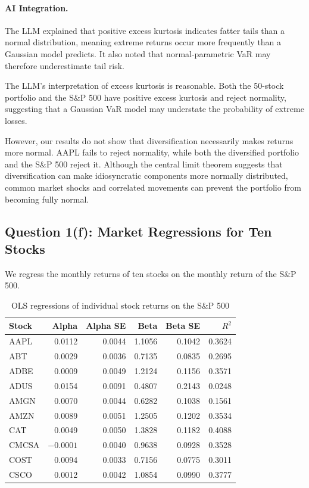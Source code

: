 \documentclass[11pt]{article}
\begin{document}
\paragraph{AI Integration.} The LLM explained that positive excess kurtosis indicates fatter tails than a normal distribution, meaning extreme returns occur more frequently than a Gaussian model predicts. It also noted that normal-parametric VaR may therefore underestimate tail risk.

The LLM's interpretation of excess kurtosis is reasonable. Both the 50-stock portfolio and the S\&P 500 have positive excess kurtosis and reject normality, suggesting that a Gaussian VaR model may understate the probability of extreme losses.

However, our results do not show that diversification necessarily makes returns more normal. AAPL fails to reject normality, while both the diversified portfolio and the S\&P 500 reject it. Although the central limit theorem suggests that diversification can make idiosyncratic components more normally distributed, common market shocks and correlated movements can prevent the portfolio from becoming fully normal.

\subsection{Question 1(f): Market Regressions for Ten Stocks}

We regress the monthly returns of ten stocks on the monthly return of the S\&P 500.

\begin{table}[H]
\centering
\caption{OLS regressions of individual stock returns on the S\&P 500}
\begin{tabular}{lrrrrr}
\toprule
Stock & Alpha & Alpha SE & Beta & Beta SE & $R^2$ \\
\midrule
AAPL  & 0.0112 & 0.0044 & 1.1056 & 0.1042 & 0.3624 \\
ABT   & 0.0029 & 0.0036 & 0.7135 & 0.0835 & 0.2695 \\
ADBE  & 0.0009 & 0.0049 & 1.2124 & 0.1156 & 0.3571 \\
ADUS  & 0.0154 & 0.0091 & 0.4807 & 0.2143 & 0.0248 \\
AMGN  & 0.0070 & 0.0044 & 0.6282 & 0.1038 & 0.1561 \\
AMZN  & 0.0089 & 0.0051 & 1.2505 & 0.1202 & 0.3534 \\
CAT   & 0.0049 & 0.0050 & 1.3828 & 0.1182 & 0.4088 \\
CMCSA & $-0.0001$ & 0.0040 & 0.9638 & 0.0928 & 0.3528 \\
COST  & 0.0094 & 0.0033 & 0.7156 & 0.0775 & 0.3011 \\
CSCO  & 0.0012 & 0.0042 & 1.0854 & 0.0990 & 0.3777 \\
\bottomrule
\end{tabular}
\end{table}
\end{document}
